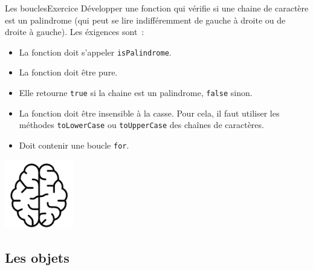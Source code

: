 \documentclass{beamer}
\begin{document}
    \begin{frame}{Les boucles}{Exercice \execcounterdispinc{}}
        Développer une fonction qui vérifie si une chaine de caractère est un palindrome (qui peut se lire indifféremment de gauche à droite ou de droite à gauche).
        Les éxigences sont~:
        \begin{itemize}
            \item La fonction doit s'appeler \lstinline{isPalindrome}.
            \item La fonction doit être pure.
            \item Elle retourne \lstinline{true} si la chaine est un palindrome, \lstinline{false} sinon.
            \item La fonction doit être insensible à la casse.
            Pour cela, il faut utiliser les méthodes \lstinline{toLowerCase} ou \lstinline{toUpperCase} des chaînes de caractères.
            \item Doit contenir une boucle \lstinline{for}.
        \end{itemize}
        \bigbreak
        \centering
        \includegraphics[width=3cm]{image/intelligence}
    \end{frame}

    \subsection{Les objets}\label{subsec:object}
\end{document}
